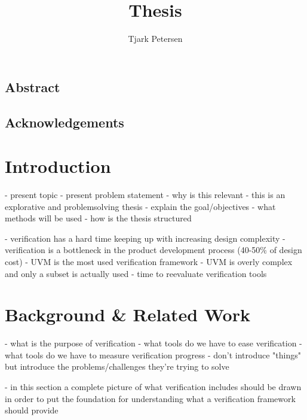 \documentclass[12pt]{book}
\author{Tjark Petersen}
\title{Thesis}
\begin{document}
\maketitle

\section*{Abstract} %

\section*{Acknowledgements} %

\newpage

\tableofcontents

% 
\chapter{Introduction} %

- present topic
- present problem statement
- why is this relevant
- this is an explorative and problemsolving thesis
- explain the goal/objectives
- what methods will be used
- how is the thesis structured

- verification has a hard time keeping up with increasing design complexity
- verification is a bottleneck in the product development process (40-50\% of design cost) \cite{mehta2018asic}
- UVM is the most used verification framework
- UVM is overly complex and only a subset is actually used \cite{sutherland2015uvm}
- time to reevaluate verification tools

\chapter{Background \& Related Work} %

- what is the purpose of verification
- what tools do we have to ease verification
- what tools do we have to measure verification progress
- don't introduce "things" but introduce the problems/challenges they're trying to solve

- in this section a complete picture of what verification includes should be drawn in order to put the foundation for understanding what a verification framework should provide
\end{document}
